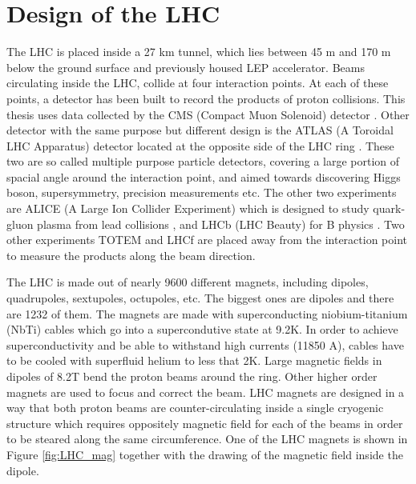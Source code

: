 \section{Design of the LHC}

The LHC is placed inside a 27 km tunnel, which lies between 45 m and 170 m below the ground surface and previously housed LEP accelerator. Beams circulating inside the LHC, collide at four interaction points. At each of these points, a detector has been built to record the products of proton collisions. This thesis uses data collected by the CMS (Compact Muon Solenoid) detector \cite{Chatrchyan:2008aa}. Other detector with the same purpose but different design is the ATLAS (A Toroidal LHC Apparatus) detector located at the opposite side of the LHC ring \cite{Aad:2008zzm} . These two are so called multiple purpose particle detectors, covering a large portion of spacial angle around the interaction point, and aimed towards discovering Higgs boson, supersymmetry, precision measurements etc. The other two experiments are ALICE (A Large Ion Collider Experiment) which is designed to study quark-gluon plasma from lead collisions \cite{Aamodt:2008zz}, and LHCb (LHC Beauty) for B physics \cite{Alves:2008zz}. Two other experiments TOTEM and LHCf are placed away from the interaction point to measure the products along the beam direction.
\par The LHC is made out of nearly 9600 different magnets, including dipoles, quadrupoles, sextupoles, octupoles, etc. The biggest ones are dipoles and there are 1232 of them. The magnets are made with superconducting niobium-titanium (NbTi) cables which go into a supercondutive state at 9.2K. In order to achieve superconductivity and be able to withstand high currents (11850 A), cables have to be cooled with superfluid helium to less that 2K. Large magnetic fields in dipoles of 8.2T bend the proton beams around the ring. Other higher order magnets are used to focus and correct the beam. LHC magnets are designed in a way that both proton beams are counter-circulating inside a single cryogenic structure which requires oppositely  magnetic field for each of the beams in order to be steared along the same circumference. One of the LHC magnets is shown in Figure \ref{fig:LHC_mag} together with the drawing of the magnetic field inside the dipole. 
    
